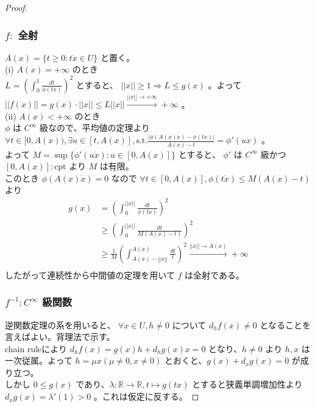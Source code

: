 \documentclass[a4paper,10pt]{jsarticle}
\begin{document}
\begin{proof}
  \subsubsection*{$f:$ 全射}
  $A(x)=\{t \geq 0: t\dot{x} \in U\}$ と置く。 \\
  (i) $A(x)=+\infty$ のとき \\
  $L=(\int_{0}^{1} \frac{dt}{\phi(t\dot{x})})^2$ とすると、 $||x|| \geq 1 \Rightarrow L \leq g(x)$ 。よって $||f(x)||=g(x)\cdot ||x|| \leq L||x||\xrightarrow{||x|| \to +\infty} +\infty$ 。
  \\
  (ii) $A(x)<+\infty$ のとき \\
  $\phi$ は $C^\infty$ 級なので、平均値の定理より $\forall t \in [0,A(x)),\exists u \in [t,A(x)],\mbox{s.t.} \frac{|\phi(A(x)\dot{x})-\phi(t\dot{x})|}{A(x)-t}=\phi'(u\dot{x})$ 。 \\
  よって $M=\sup\{\phi'(u\dot{x}):u \in [0,A(x)]\}$ とすると、 $\phi'$ は $C^\infty$ 級かつ $[0,A(x)]:\mbox{cpt}$ より $M$ は有限。 \\
  このとき $\phi(A(x)\dot{x})=0$ なので $\forall t \in [0,A(x)],\phi(t\dot{x}) \leq M(A(x)-t)$ より
  \begin{align*}
    g(x) &=(\int_{0}^{||x||} \frac{dt}{\phi(t\dot{x})})^2 \\
    & \geq (\int_{0}^{||x||} \frac{dt}{M(A(x)-t)})^2 \\
    & \geq \frac{1}{M} (\int_{A(x)-||x||}^{A(x)} \frac{dt}{t})^2 \xrightarrow{||x|| \to A(x)} +\infty \\
  \end{align*}
  したがって連続性から中間値の定理を用いて $f$ は全射である。

  \subsubsection*{$f^{-1}:C^\infty$ 級関数}
  逆関数定理の系を用いると、 $\forall x \in U,h \neq 0$ について $d_hf(x) \neq 0$ となることを言えばよい。背理法で示す。 \\
  chain ruleにより $d_hf(x)=g(x)h+d_hg(x)x=0$ となり、$h \neq 0$ より $h,x$ は一次従属。よって $h=\mu x(\mu \neq 0,x \neq 0)$ とおくと、$g(x)+d_xg(x)=0$ が成り立つ。 \\
  しかし $0 \leq g(x)$ であり、$\lambda:\mathbb{R} \to \mathbb{R},t \mapsto g(tx)$ とすると狭義単調増加性より $d_xg(x)=\lambda'(1)>0$ 。これは仮定に反する。
\end{proof}
\end{document}
